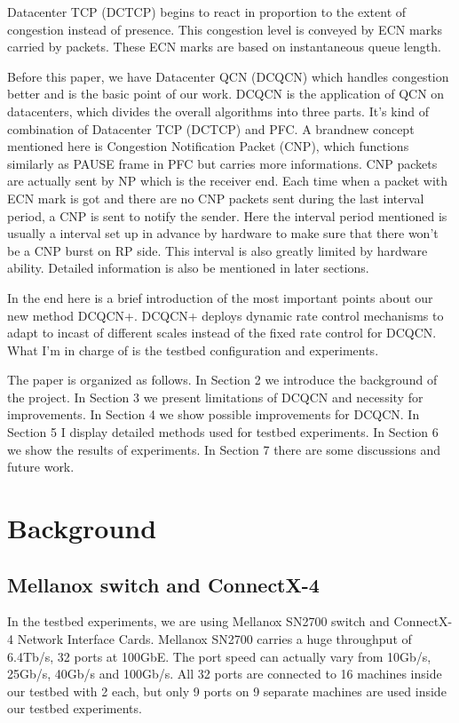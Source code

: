 \documentclass[12pt,a4paper]{article}
\begin{document}
Datacenter TCP (DCTCP) \cite{dctcp} begins to react in proportion to the extent of congestion instead of presence.
This congestion level is conveyed by ECN marks carried by packets.
These ECN marks are based on instantaneous queue length.

Before this paper, we have Datacenter QCN (DCQCN) \cite{dcqcn} which handles congestion better and is the basic point of our work.
DCQCN is the application of QCN on datacenters, which divides the overall algorithms into three parts.
It's kind of combination of Datacenter TCP (DCTCP) and PFC.
A brandnew concept mentioned here is Congestion Notification Packet (CNP), which functions similarly as PAUSE frame in PFC but carries more informations.
CNP packets are actually sent by NP which is the receiver end.
Each time when a packet with ECN mark is got and there are no CNP packets sent during the last interval period, a CNP is sent to notify the
sender.
Here the interval period mentioned is usually a interval set up in advance by hardware to make sure that there won't be a CNP burst on
RP side.
This interval is also greatly limited by hardware ability.
Detailed information is also be mentioned in later sections.

In the end here is a brief introduction of the most important points about our new method DCQCN+.
DCQCN+ deploys dynamic rate control mechanisms to adapt to incast of different scales instead of the fixed rate control for DCQCN.
What I'm in charge of is the testbed configuration and experiments.

The paper is organized as follows.
In Section 2 we introduce the background of the project.
In Section 3 we present limitations of DCQCN and necessity for improvements.
In Section 4 we show possible improvements for DCQCN.
In Section 5 I display detailed methods used for testbed experiments.
In Section 6 we show the results of experiments.
In Section 7 there are some discussions and future work.

\section{Background}
\subsection{Mellanox switch and ConnectX-4}
In the testbed experiments, we are using Mellanox SN2700 switch and ConnectX-4 Network Interface Cards.
Mellanox SN2700 carries a huge throughput of 6.4Tb/s, 32 ports at 100GbE.
The port speed can actually vary from 10Gb/s, 25Gb/s, 40Gb/s and 100Gb/s.
All 32 ports are connected to 16 machines inside our testbed with 2 each, but only 9 ports on 9 separate machines are used inside our
testbed experiments.
\end{document}
